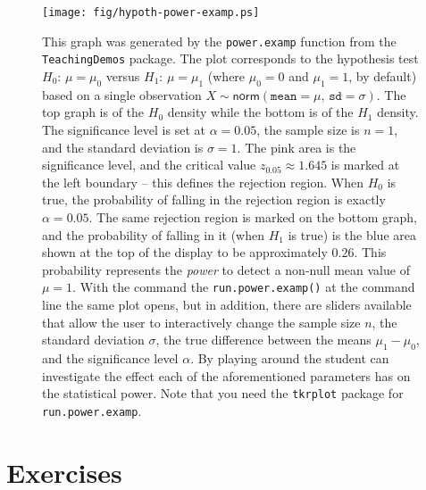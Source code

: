 \begin{figure}[ht!]
\centering
\texttt{[image: fig/hypoth-power-examp.ps]}
\caption[Plot of significance level and power]{\label{fig-power-examp}\small This graph was generated by the \texttt{power.examp} function from the \texttt{TeachingDemos} package. The plot corresponds to the hypothesis test \(H_{0}:\,\mu=\mu_{0}\) versus \(H_{1}:\,\mu=\mu_{1}\) (where \(\mu_{0}=0\) and \(\mu_{1}=1\), by default) based on a single observation \(X\sim\mathsf{norm}(\mathtt{mean}=\mu,\,\mathtt{sd}=\sigma)\). The top graph is of the \(H_{0}\) density while the bottom is of the \(H_{1}\) density. The significance level is set at \(\alpha=0.05\), the sample size is \(n=1\), and the standard deviation is \(\sigma=1\). The pink area is the significance level, and the critical value \(z_{0.05}\approx1.645\) is marked at the left boundary -- this defines the rejection region. When \(H_{0}\) is true, the probability of falling in the rejection region is exactly \(\alpha=0.05\). The same rejection region is marked on the bottom graph, and the probability of falling in it (when \(H_{1}\)  is true) is the blue area shown at the top of the display to be approximately \(0.26\). This probability represents the \emph{power} to detect a non-null mean value of \(\mu=1\). With the command the \texttt{run.power.examp()} at the command line the same plot opens, but in addition, there are sliders available that allow the user to interactively change the sample size \(n\), the standard deviation \(\sigma\), the true difference between the means \(\mu_{1}-\mu_{0}\), and the significance level \(\alpha\). By playing around the student can investigate the effect each of the aforementioned parameters has on the statistical power. Note that you need the \texttt{tkrplot} package \cite{tkrplot} for \texttt{run.power.examp}.}
\end{figure}

\newpage{}

\section{Exercises}
\label{sec-10-8}

\setcounter{thm}{0}
